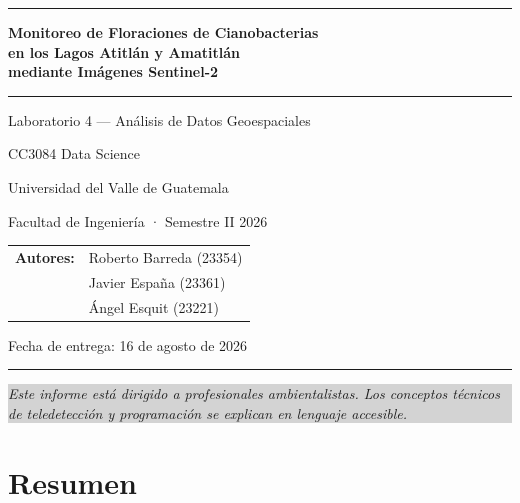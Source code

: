 \documentclass[12pt, a4paper]{article}
\newcommand{\nota}[1]{\vspace{2pt}\noindent\colorbox{lightgray}{\parbox{\dimexpr\linewidth-2\fboxsep\relax}{\small\textit{#1}}}\vspace{4pt}}
\begin{document}
\begin{titlepage}
  \centering
  \vspace*{1cm}
  {\color{uvgblue}\rule{\linewidth}{2pt}}\vspace{8pt}

  {\LARGE\bfseries\color{uvgblue}
    Monitoreo de Floraciones de Cianobacterias\\[6pt]
    en los Lagos Atitlán y Amatitlán\\[4pt]
    mediante Imágenes Sentinel-2
  }\vspace{10pt}

  {\color{uvgblue}\rule{\linewidth}{1pt}}\vspace{14pt}

  {\large Laboratorio 4 — Análisis de Datos Geoespaciales}\vspace{4pt}

  {\normalsize CC3084 Data Science}\vspace{2pt}

  {\normalsize Universidad del Valle de Guatemala}\vspace{2pt}

  {\normalsize Facultad de Ingeniería · Semestre II 2026}\vspace{20pt}

  \begin{tabular}{ll}
    \textbf{Autores:} & Roberto Barreda \quad (23354) \\
                      & Javier España    \quad (23361) \\
                      & Ángel Esquit   \quad (23221)
  \end{tabular}\vspace{20pt}

  {\normalsize Fecha de entrega: 16 de agosto de 2026}\vspace{10pt}

  {\color{uvgblue}\rule{\linewidth}{2pt}}

  \vfill
  \nota{Este informe está dirigido a profesionales ambientalistas. Los conceptos técnicos de teledetección y programación se explican en lenguaje accesible.}
\end{titlepage}

\section*{Resumen}
\end{document}
